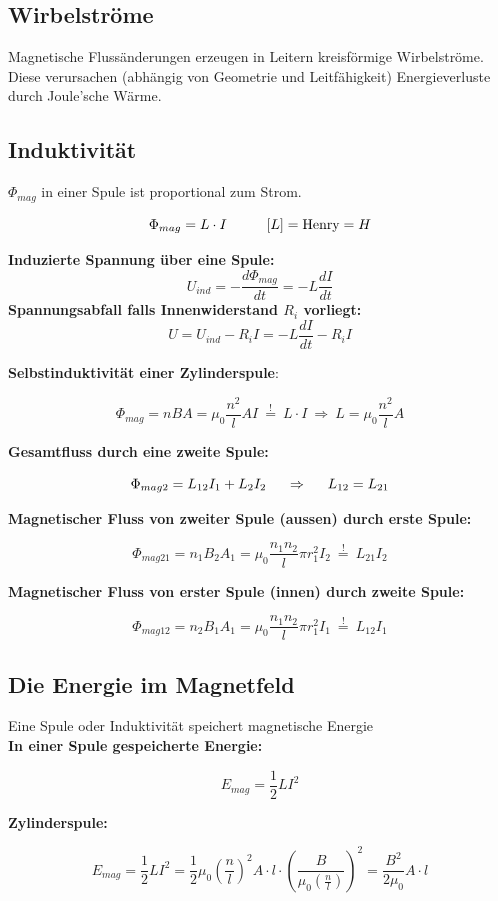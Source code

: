 \subsection{Wirbelströme}
Magnetische Flussänderungen erzeugen in Leitern kreisförmige Wirbelströme. Diese verursachen (abhängig von Geometrie und Leitfähigkeit) Energieverluste durch Joule'sche Wärme.

\subsection{Induktivität}
$\Phi_{mag}$ in einer Spule ist proportional zum Strom.
\begin{formulabox}
    \[
        \Phi_{mag} = L \cdot I \hspace{10mm} [L] = \text{Henry} = H
    \]
\end{formulabox}
\textbf{Induzierte Spannung über eine Spule:}
\[
    U_{ind} = - \frac{d\Phi_{mag}}{dt} = -L\frac{dI}{dt}
\]
\textbf{Spannungsabfall falls Innenwiderstand $R_i$ vorliegt:}
\[
    U = U_{ind} - R_i I = - L \frac{dI}{dt} - R_i I
\]

\textbf{Selbstinduktivität einer Zylinderspule}:
\begin{formulabox}
    \[
       \Phi_{mag} = nBA = \mu_0 \frac{n^2}{l}AI \ \stackrel{!}{=} \ L \cdot I \ \Rightarrow \ L = \mu_0 \frac{n^2}{l}A
    \]
\end{formulabox}

\textbf{Gesamtfluss durch eine zweite Spule:}
\begin{formulabox}
    \[
        \Phi_{mag2} = L_{12}I_1 + L_2I_2 \hspace{5mm} \Rightarrow \hspace{5mm} L_{12} = L_{21}
    \] 
\end{formulabox}
\textbf{Magnetischer Fluss von zweiter Spule (aussen) durch erste Spule:}
\begin{formulabox}
    \[
        \Phi_{mag21} = n_1B_2A_1 = \mu_0 \frac{n_1n_2}{l}\pi r_1^2 I_2 \ \stackrel{!}{=} \ L_{21}I_2
    \]
\end{formulabox}
\textbf{Magnetischer Fluss von erster Spule (innen) durch zweite Spule:}
\begin{formulabox}
    \[
        \Phi_{mag12} = n_2B_1A_1 = \mu_0 \frac{n_1n_2}{l}\pi r_1^2 I_1 \ \stackrel{!}{=} \ L_{12}I_1
    \]
\end{formulabox}

\subsection{Die Energie im Magnetfeld}
Eine Spule oder Induktivität speichert magnetische Energie\\[1ex]
\textbf{In einer Spule gespeicherte Energie:}
\begin{formulabox}
    \[
        E_{mag} = \frac{1}{2} L I^2
    \]
\end{formulabox}
\textbf{Zylinderspule:}
\begin{formulabox}
    \[
        E_{mag} = \frac{1}{2}LI^2 = \frac{1}{2}\mu_0\left( \frac{n}{l} \right)^2 A \cdot l \cdot \left( \frac{B}{\mu_0\left( \frac{n}{l} \right)} \right)^2 = \frac{B^2}{2\mu_0}A\cdot l
    \]
\end{formulabox}

